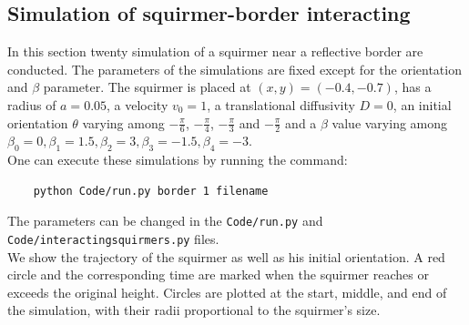 \documentclass{article}
\begin{document}
\subsection{Simulation of squirmer-border interacting}
In this section twenty simulation of a squirmer near a reflective border are conducted. The parameters of the simulations are fixed
except for the orientation and $\beta$ parameter. The squirmer is placed at $(x,y) = (-0.4,-0.7)$, has a radius of $a=0.05$,
a velocity $v_0=1$, a translational diffusivity $D=0$, an initial orientation $\theta$ varying among $-\frac{\pi}{6}$, $-\frac{\pi}{4}$, $-\frac{\pi}{3}$
and $-\frac{\pi}{2}$ and a $\beta$ value varying among $\beta_0 = 0, \beta_1 = 1.5, \beta_2 = 3, \beta_3 = -1.5, \beta_4 = -3$.\\
One can execute these simulations by running the command:
 \begin{verbatim}
    python Code/run.py border 1 filename
 \end{verbatim}
 The parameters can be changed in the \texttt{Code/run.py} and \texttt{Code/interactingsquirmers.py} files.\\
 We show the trajectory of the squirmer as well as his initial orientation. A red circle and the corresponding time are marked when the squirmer
 reaches or exceeds the original height. Circles are plotted at the start, 
 middle, and end of the simulation, with their radii proportional to the squirmer's size.
\end{document}
